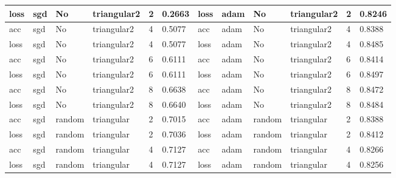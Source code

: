 \begin{table}[H]
\begin{adjustbox}{width=1\textwidth}
\begin{tabular}{|l|l|l|l|l|l||l|l|l|l|l|l|}
loss          & sgd          & No          & triangular2     & 2             & 0.2663            & loss          & adam         & No          & triangular2     & 2             & 0.8246            \\ \hline
acc           & sgd          & No          & triangular2     & 4             & 0.5077            & acc           & adam         & No          & triangular2     & 4             & 0.8388            \\ \hline
loss          & sgd          & No          & triangular2     & 4             & 0.5077            & loss          & adam         & No          & triangular2     & 4             & 0.8485            \\ \hline
acc           & sgd          & No          & triangular2     & 6             & 0.6111            & acc           & adam         & No          & triangular2     & 6             & 0.8414            \\ \hline
loss          & sgd          & No          & triangular2     & 6             & 0.6111            & loss          & adam         & No          & triangular2     & 6             & 0.8497            \\ \hline
acc           & sgd          & No          & triangular2     & 8             & 0.6638            & acc           & adam         & No          & triangular2     & 8             & 0.8472            \\ \hline
loss          & sgd          & No          & triangular2     & 8             & 0.6640            & loss          & adam         & No          & triangular2     & 8             & 0.8484            \\ \hline
acc           & sgd          & random        & triangular      & 2             & 0.7015            & acc           & adam         & random        & triangular      & 2             & 0.8388            \\ \hline
loss          & sgd          & random        & triangular      & 2             & 0.7036            & loss          & adam         & random        & triangular      & 2             & 0.8412            \\ \hline
acc           & sgd          & random        & triangular      & 4             & 0.7127            & acc           & adam         & random        & triangular      & 4             & 0.8266            \\ \hline
loss          & sgd          & random        & triangular      & 4             & 0.7127            & loss          & adam         & random        & triangular      & 4             & 0.8256            \\ \hline

\end{tabular}
\end{adjustbox}
\end{table}
